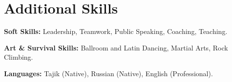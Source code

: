 \documentclass[letterpaper,11pt]{article}
\newcommand{\resumeSubHeadingListStart}{\begin{itemize}[leftmargin=0.15in, label={}]}
\newcommand{\resumeSubHeadingListEnd}{\end{itemize}}
\begin{document}
\section{Additional Skills}
  \vspace{2pt}
  \resumeSubHeadingListStart
    \small{\item{
      \textcolor{secondary_color}{\textbf{Soft Skills:}}{ Leadership, Teamwork, Public Speaking, Coaching, Teaching.} \\ \vspace{3pt}
        
      \textcolor{secondary_color}{\textbf{Art \& Survival Skills:}}{ Ballroom and Latin Dancing, Martial Arts, Rock Climbing.} \\ \vspace{3pt}
    
      \textcolor{secondary_color}{\textbf{Languages:}}{ Tajik (Native), Russian (Native), English (Professional).}  
    }}
  \resumeSubHeadingListEnd







\end{document}
